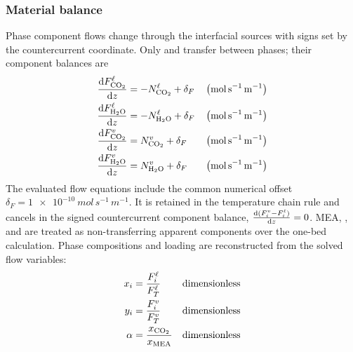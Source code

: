 \subsubsection{Material balance}\label{subsubsec:material-balance}
Phase component flows change through the interfacial sources with signs set by the countercurrent coordinate.
Only \COtwo{} and \HtwoO{} transfer between phases; their component balances are
\begin{align}
\odv{\molarflow^{\liq}_{ \COtwo}}{z} &= -\molarflux^{\liq}_{ \COtwo} + \delta_F && \left(\unit{mol\,s^{-1}\,m^{-1}}\right)\\
\odv{\molarflow^{\liq}_{ \HtwoO}}{z} &= -\molarflux^{\liq}_{ \HtwoO} + \delta_F && \left(\unit{mol\,s^{-1}\,m^{-1}}\right)\\
\odv{\molarflow^{\vap}_{ \COtwo}}{z} &= \molarflux^{\vap}_{ \COtwo} + \delta_F && \left(\unit{mol\,s^{-1}\,m^{-1}}\right)\\
\odv{\molarflow^{\vap}_{ \HtwoO}}{z} &= \molarflux^{\vap}_{ \HtwoO} + \delta_F && \left(\unit{mol\,s^{-1}\,m^{-1}}\right)\label{eq:material-balance}
\end{align}
The evaluated flow equations include the common numerical offset \(\delta_F=\qty{1e-10}{mol\,s^{-1}\,m^{-1}}\).
It is retained in the temperature chain rule and cancels in the signed countercurrent component balance, \(\odv{(\molarflow_i^\vap-\molarflow_i^\liq)}{z}=0\).
MEA, \Ntwo, and \Otwo{} are treated as non-transferring apparent components over the one-bed calculation.
Phase compositions and loading are reconstructed from the solved flow variables:
\begin{align}
x_i &= \frac{\molarflow^{\liq}_{ i}}{\molarflow^{\liq}_{ T}}
&& \text{dimensionless}\\
y_i &= \frac{\molarflow^{\vap}_{ i}}{\molarflow^{\vap}_{ T}}
&& \text{dimensionless}\\
\alpha &= \frac{x_{\COtwo}}{x_{\MEA}}
&& \text{dimensionless}
\end{align}

